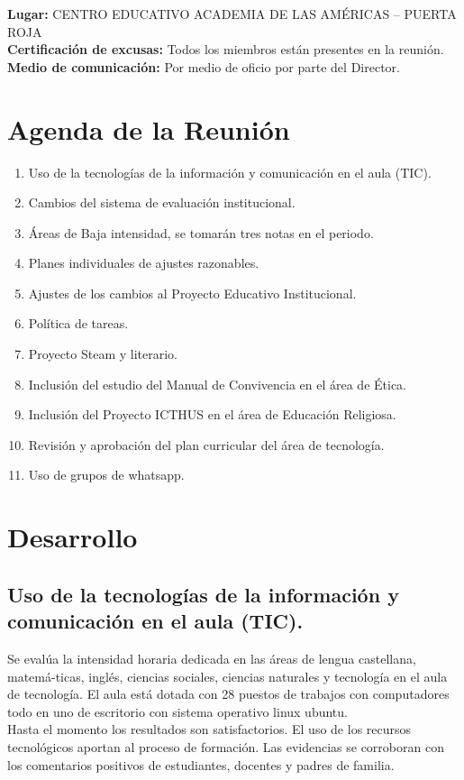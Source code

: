 \documentclass[12pt, letterpaper, twoside]{article}
\title{\acta{}}
\date{Sincelejo - 6 de abril 2018}
\begin{document}
\maketitle %

\textbf{Lugar:} CENTRO EDUCATIVO ACADEMIA DE LAS AMÉRICAS – PUERTA ROJA \\
\textbf{Certificación de excusas:} Todos los miembros están presentes en la reunión. \\
\textbf{Medio de comunicación:} Por medio de oficio por parte del Director.\\

\section{Agenda de la Reunión}
\begin{enumerate}
  \item Uso de la tecnologías de la información y comunicación en el aula (TIC).
  \item Cambios del sistema de evaluación institucional.
  \item Áreas de Baja intensidad, se tomarán tres notas en el periodo.
\item Planes individuales de ajustes razonables.
\item Ajustes de los cambios al Proyecto Educativo Institucional.
\item Política de tareas.
\item Proyecto Steam y literario.
\item Inclusión del estudio del Manual de Convivencia en el área de Ética.
\item Inclusión del Proyecto ICTHUS en el área de Educación Religiosa.
\item Revisión y aprobación del plan curricular del área de tecnología.
\item Uso de grupos de whatsapp.
\end{enumerate}

\section{Desarrollo}
\subsection{Uso de la tecnologías de la información y comunicación en el aula (TIC).} Se evalúa la intensidad horaria dedicada en las áreas de lengua castellana, matemá-ticas, inglés, ciencias sociales, ciencias naturales y tecnología en el aula de tecnología. El aula está dotada con 28 puestos de trabajos con computadores todo en uno de escritorio con sistema operativo linux ubuntu. \\ Hasta el momento los resultados son satisfactorios. El uso de los recursos tecnológicos aportan al proceso de formación. Las evidencias se corroboran con los comentarios positivos de estudiantes, docentes y padres de familia.
\end{document}

